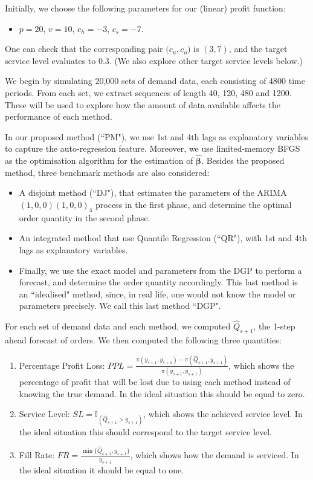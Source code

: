 \documentclass{article}
\begin{document}
Initially, we choose the following parameters for our (linear) profit function:
\begin{itemize}
    \item $p=20$, $v=10$, $c_h=-3$, $c_s=-7$.
\end{itemize}
One can check that the corresponding pair $\big( c_u,c_o \big)$ is $(3,7)$, and the target service level evaluates to $0.3$. (We also explore other target service levels below.)

We begin by simulating 20,000 sets of demand data, each consisting of 4800 time periods. From each set, we extract sequences of length 40, 120, 480 and 1200. These will be used to explore how the amount of data available affects the performance of each method.

In our proposed method (``PM"), we use 1st and 4th lags as explanatory variables to capture the auto-regression feature. Moreover, we use limited-memory BFGS \cite{LN89} as the optimisation algorithm for the estimation of $\hat{\boldsymbol{\beta}}$. Besides the proposed method, three benchmark methods are also considered:
\begin{itemize}
    \item A disjoint method (``DJ"), that estimates the parameters of the ARIMA$(1,0,0)(1,0,0)_4$ process in the first phase, and determine the optimal order quantity in the second phase.
    \item An integrated method that use Quantile Regression (``QR"), with 1st and 4th lags as explanatory variables.
    \item Finally, we use the exact model and parameters from the DGP to perform a forecast, and determine the order quantity accordingly. This last method is an ``idealised" method, since, in real life, one would not know the model or parameters precisely. We call this last method ``DGP".
\end{itemize}

For each set of demand data and each method, we computed $\hat{Q}_{s+1}$, the 1-step ahead forecast of orders. We then computed the following three quantities:
\begin{enumerate}
    \item Percentage Profit Loss:  $PPL=\frac{\pi(y_{s+1},y_{s+1})-\pi(\hat{Q}_{s+1},y_{s+1})}{\pi(y_{s+1},y_{s+1})}$, which shows the percentage of profit that will be lost due to using each method instead of knowing the true demand. In the ideal situation this should be equal to zero.
    \item Service Level: $SL=\mathbb {I}_{(\hat{Q}_{s+1}>y_{s+1})}$, which shows the achieved service level. In the ideal situation this should correspond to the target service level.
    \item Fill Rate: $FR=\frac{\min\{\hat{Q}_{s+1},y_{s+1}\}}{y_{s+1}}$, which shows how the demand is serviced. In the ideal situation it should be equal to one.
\end{enumerate}
\end{document}
